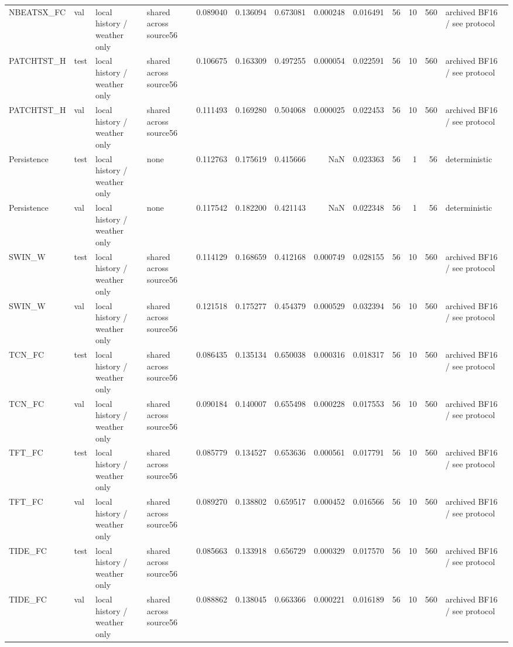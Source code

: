 \begin{tabular}{llllrrrrrrrrl}
NBEATSX\_FC & val & local history / weather only & shared across source56 & 0.089040 & 0.136094 & 0.673081 & 0.000248 & 0.016491 & 56 & 10 & 560 & archived BF16 / see protocol \\
PATCHTST\_H & test & local history / weather only & shared across source56 & 0.106675 & 0.163309 & 0.497255 & 0.000054 & 0.022591 & 56 & 10 & 560 & archived BF16 / see protocol \\
PATCHTST\_H & val & local history / weather only & shared across source56 & 0.111493 & 0.169280 & 0.504068 & 0.000025 & 0.022453 & 56 & 10 & 560 & archived BF16 / see protocol \\
Persistence & test & local history / weather only & none & 0.112763 & 0.175619 & 0.415666 & NaN & 0.023363 & 56 & 1 & 56 & deterministic \\
Persistence & val & local history / weather only & none & 0.117542 & 0.182200 & 0.421143 & NaN & 0.022348 & 56 & 1 & 56 & deterministic \\
SWIN\_W & test & local history / weather only & shared across source56 & 0.114129 & 0.168659 & 0.412168 & 0.000749 & 0.028155 & 56 & 10 & 560 & archived BF16 / see protocol \\
SWIN\_W & val & local history / weather only & shared across source56 & 0.121518 & 0.175277 & 0.454379 & 0.000529 & 0.032394 & 56 & 10 & 560 & archived BF16 / see protocol \\
TCN\_FC & test & local history / weather only & shared across source56 & 0.086435 & 0.135134 & 0.650038 & 0.000316 & 0.018317 & 56 & 10 & 560 & archived BF16 / see protocol \\
TCN\_FC & val & local history / weather only & shared across source56 & 0.090184 & 0.140007 & 0.655498 & 0.000228 & 0.017553 & 56 & 10 & 560 & archived BF16 / see protocol \\
TFT\_FC & test & local history / weather only & shared across source56 & 0.085779 & 0.134527 & 0.653636 & 0.000561 & 0.017791 & 56 & 10 & 560 & archived BF16 / see protocol \\
TFT\_FC & val & local history / weather only & shared across source56 & 0.089270 & 0.138802 & 0.659517 & 0.000452 & 0.016566 & 56 & 10 & 560 & archived BF16 / see protocol \\
TIDE\_FC & test & local history / weather only & shared across source56 & 0.085663 & 0.133918 & 0.656729 & 0.000329 & 0.017570 & 56 & 10 & 560 & archived BF16 / see protocol \\
TIDE\_FC & val & local history / weather only & shared across source56 & 0.088862 & 0.138045 & 0.663366 & 0.000221 & 0.016189 & 56 & 10 & 560 & archived BF16 / see protocol \\

\end{tabular}
